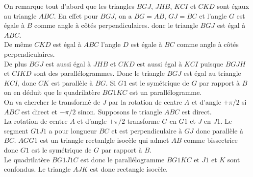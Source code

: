 \documentclass[a4paper,11pt]{book}
\begin{document}
On remarque tout d'abord que les triangles $BGJ$, $JHB$, $KCI$ et $CKD$ sont 
\'egaux au triangle $ABC$. En effet pour $BGJ$, on a $BG=AB$, $GJ=BC$ et 
l'angle $G$ est \'egale \`a $B$ comme angle \`a c\^ot\'es perpendiculaires.
donc le triangle $BGJ$ est \'egal \`a $ABC$.\\ 
De m\^eme $CKD$ est \'egal \`a $ABC$ l'angle $D$ est \'egale \`a $BC$ comme 
angle \`a c\^ot\'es perpendiculaires.\\
De plus $BGJ$ est aussi \'egal \`a $JHB$ et $CKD$  est aussi \'egal \`a $KCI$
puisque $BGJH$ et $CIKD$ sont des parall\'elogrammes.
Donc le triangle $BGJ$ est \'egal au triangle $KCI$, donc $CK$ est parall\`ele 
\`a $BG$. Si $G1$ est le sym\'etrique de $G$ par rapport \`a $B$ on en d\'eduit que le quadrilat\`ere $BG1KC$ est un parall\'elogramme.\\
On va chercher le transform\'e de $J$ par la rotation de centre $A$ et d'angle 
$+\pi/2$ si $ABC$ est direct et $-\pi/2$ sinon.
Supposons le triangle $ABC$ est direct.\\
La rotation de centre $A$ et d'angle $+\pi/2$ transforme $G$ en $G1$ et $J$ en 
$J1$. Le segment $G1J1$ a pour longueur $BC$ et est perpendiculaire \`a $GJ$ 
donc parall\`ele \`a $BC$.
$AGG1$ est un triangle rectanlgle isoc\`ele qui admet $AB$ comme bissectrice 
donc $G1$ est le sym\'etrique de $G$ par rapport \`a $B$.\\
Le quadrilat\`ere $BG1J1C$ est donc le parall\'elogramme $BG1KC$ et $J1$ et $K$
 sont confondus. Le triangle $AJK$ est donc rectangle isoc\`ele.
\end{document}
